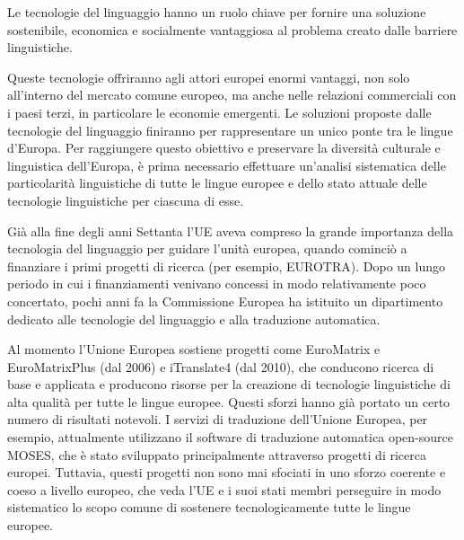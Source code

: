\begin{multicols}{2}
Le tecnologie del linguaggio hanno un ruolo chiave per fornire una soluzione sostenibile, economica e socialmente vantaggiosa al problema creato dalle barriere linguistiche.

Queste tecnologie offriranno agli attori europei enormi vantaggi, non solo all'interno del mercato comune europeo, ma anche nelle relazioni commerciali con i paesi terzi, in particolare le economie emergenti. Le soluzioni proposte dalle tecnologie del linguaggio finiranno per rappresentare un unico ponte tra le lingue d'Europa. Per raggiungere questo obiettivo e preservare la diversit\`{a} culturale e linguistica dell'Europa, \`{e} prima necessario effettuare un'analisi sistematica delle particolarit\`{a} linguistiche di tutte le lingue europee e dello stato attuale delle tecnologie linguistiche per ciascuna di esse.


Gi\`{a} alla fine degli anni Settanta l'UE aveva compreso la grande
importanza della tecnologia del linguaggio per guidare l'unit\`{a} europea, quando cominci\`{o} a finanziare i primi progetti di ricerca (per esempio, EUROTRA). Dopo un lungo periodo in cui i finanziamenti venivano concessi in modo relativamente poco concertato, pochi anni fa la Commissione Europea ha istituito un dipartimento dedicato alle tecnologie del linguaggio e alla traduzione automatica.

Al momento l'Unione Europea sostiene progetti come EuroMatrix e EuroMatrixPlus (dal 2006) e iTranslate4 (dal 2010), che conducono ricerca di base e applicata e producono risorse per la creazione di tecnologie linguistiche di alta qualit\`{a} per tutte le lingue europee.  Questi sforzi hanno gi\`{a} portato un certo numero di risultati notevoli. I servizi di traduzione dell'Unione Europea, per esempio, attualmente utilizzano il software di traduzione automatica open-source MOSES, che \`{e} stato sviluppato principalmente attraverso progetti di ricerca europei. Tuttavia, questi progetti non sono mai sfociati in uno sforzo coerente e coeso a livello europeo, che veda l'UE e i suoi stati membri perseguire in modo sistematico lo scopo comune di sostenere tecnologicamente tutte le lingue europee.


\end{multicols}
